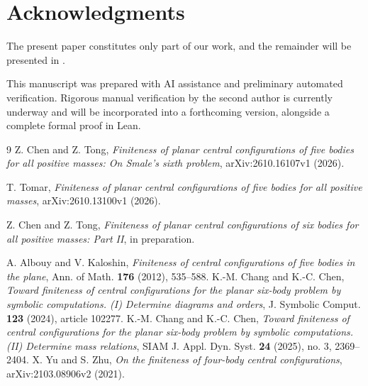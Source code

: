 \documentclass[11pt]{amsart}
\theoremstyle{remark}
\begin{document}
\section*{Acknowledgments}
The present paper constitutes only part of our work, and the remainder will be presented in \cite{CT6II}.

This manuscript was prepared with AI assistance and preliminary automated verification. Rigorous manual verification by the second author is currently underway and will be incorporated into a forthcoming version, alongside a complete formal proof in Lean.





\begin{thebibliography}{9}
 Z. Chen and Z. Tong, \emph{Finiteness of planar central configurations of five bodies for all positive masses: On Smale's sixth problem}, arXiv:2610.16107v1 (2026).

T. Tomar, \emph{Finiteness of planar central configurations of five bodies for all positive masses}, arXiv:2610.13100v1 (2026).


 Z. Chen and Z. Tong, \emph{Finiteness of planar central configurations of six bodies for all positive masses: Part II}, in preparation.


 A. Albouy and V. Kaloshin, \emph{Finiteness of central configurations of five bodies in the plane}, Ann. of Math. \textbf{176} (2012), 535--588.
 K.-M. Chang and K.-C. Chen, \emph{Toward finiteness of central configurations for the planar six-body problem by symbolic computations. (I) Determine diagrams and orders}, J. Symbolic Comput. \textbf{123} (2024), article 102277.
 K.-M. Chang and K.-C. Chen, \emph{Toward finiteness of central configurations for the planar six-body problem by symbolic computations. (II) Determine mass relations}, SIAM J. Appl. Dyn. Syst. \textbf{24} (2025), no. 3, 2369--2404.
 X. Yu and S. Zhu, \emph{On the finiteness of four-body central configurations}, arXiv:2103.08906v2 (2021).
\end{thebibliography}
\end{document}
